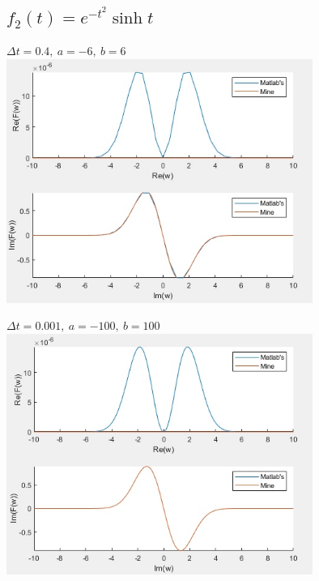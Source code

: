 \documentclass{article}
\begin{document}
{\large\subsection{$f_2(t) = e^{-t^2} \sinh t$}}
\begin{center}
  $\Delta t = 0.4,\ a = -6,\ b = 6$
  \includegraphics[width = 10cm, height 10cm]{f2_1.jpg}
  \vspace{1cm}
  
  $\Delta t = 0.001,\ a = -100,\ b = 100$
  \includegraphics[width = 10cm, height 10cm]{f2_2.jpg}
\end{center}

\newpage
\end{document}

